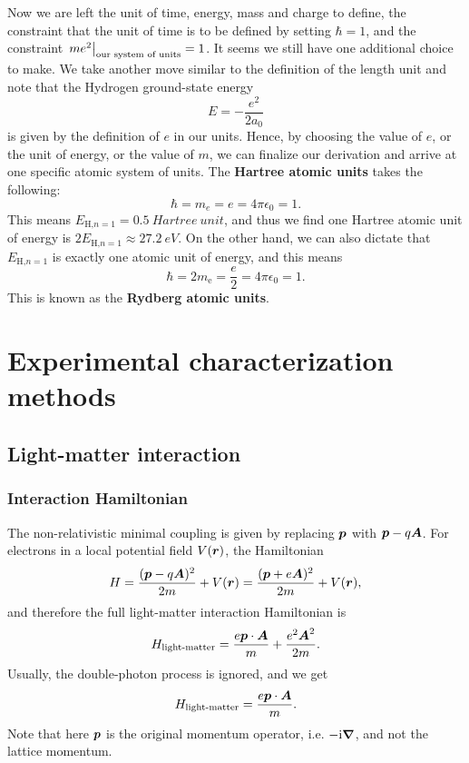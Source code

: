 \documentclass[hyperref, a4paper, 12pt]{report}
\newcommand*{\ii}{\mathrm{i}}
\newcommand*{\concept}[1]{{\textbf{#1}}}
\begin{document}
Now we are left the unit of time, energy, mass and charge to define, 
the constraint that the unit of time is to be defined by setting $\hbar = 1$,
and the constraint $\eval{m e^2}_{\text{our system of units}} = 1$.
It seems we still have one additional choice to make. 
We take another move similar to the definition of the length unit 
and note that the Hydrogen ground-state energy 
\begin{equation}
    E = - \frac{e^2}{2a_0}
\end{equation}
is given by the definition of $e$ in our units.
Hence, by choosing the value of $e$, 
or the unit of energy, or the value of $m$, 
we can finalize our derivation and arrive at one specific atomic system of units.
The \concept{Hartree atomic units} takes the following:
\begin{equation}
    \hbar = m_e = e = 4 \pi \epsilon_0 = 1.
\end{equation}
This means $E_{\text{H,$n=1$}} = \SI{0.5}{Hartree \ unit}$,
and thus we find one Hartree atomic unit of energy 
is $2 E_{\text{H,$n=1$}} \approx \SI{27.2}{eV}$.
On the other hand, we can also dictate that $E_{\text{H,$n=1$}}$
is exactly one atomic unit of energy, 
and this means 
\begin{equation}
    \hbar = 2 m_{\text{e}} = \frac{e}{2} = 4 \pi \epsilon_0 = 1.
\end{equation}
This is known as the \concept{Rydberg atomic units}.

\chapter{Experimental characterization methods}

\section{Light-matter interaction}

\subsection{Interaction Hamiltonian}

The non-relativistic minimal coupling is given by replacing $\vb*{p}$ with $\vb*{p} - q \vb*{A}$.
For electrons in a local potential field $V(\vb*{r})$, 
the Hamiltonian 
\begin{equation}
    H = \frac{(\vb*{p} - q \vb*{A})^2}{2m} + V(\vb*{r}) = \frac{(\vb*{p} + e \vb*{A})^2}{2m} + V(\vb*{r}),
\end{equation}
and therefore the full light-matter interaction Hamiltonian is 
\begin{equation}
    H_{\text{light-matter}} = \frac{e \vb*{p} \cdot \vb*{A}}{m} + \frac{e^2 \vb*{A}^2}{2m}.
\end{equation}
Usually, the double-photon process is ignored, and we get 
\begin{equation}
    H_{\text{light-matter}} = \frac{e \vb*{p} \cdot \vb*{A}}{m}.
    \label{eq:light-matter.linear}
\end{equation}
Note that here $\vb*{p}$ is the original momentum operator, i.e. $- \ii \grad$,
and not the lattice momentum.
\end{document}
